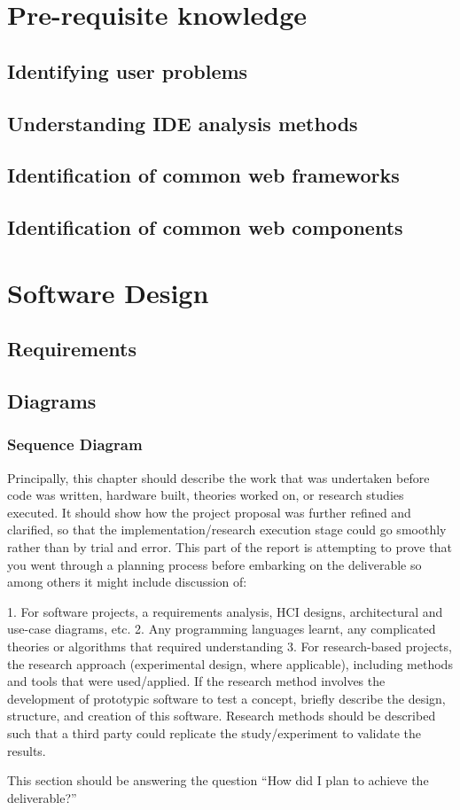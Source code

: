 \section{Pre-requisite knowledge}
\subsection{Identifying user problems}
\subsection{Understanding IDE analysis methods}
\subsection{Identification of common web frameworks}
\subsection{Identification of common web components}

\section{Software Design}
\subsection{Requirements}
\subsection{Diagrams}
\subsubsection{Sequence Diagram}


Principally, this chapter should describe the work that was undertaken before
code was written, hardware built, theories worked on, or research studies
executed. It should show how the project proposal was further refined and
clarified, so that the implementation/research execution stage could go
smoothly rather than by trial and error. This part of the report is attempting to
prove that you went through a planning process before embarking on the
deliverable so among others it might include discussion of:

1. For software projects, a requirements analysis, HCI designs, architectural
and use-case diagrams, etc.
2. Any programming languages learnt, any complicated theories or algorithms
that required understanding
3. For research-based projects, the research approach (experimental design,
where applicable), including methods and tools that were used/applied. If the
research method involves the development of prototypic software to test a
concept, briefly describe the design, structure, and creation of this software.
Research methods should be described such that a third party could replicate
the study/experiment to validate the results.

This section should be answering the question “How did I plan to achieve the
deliverable?”
